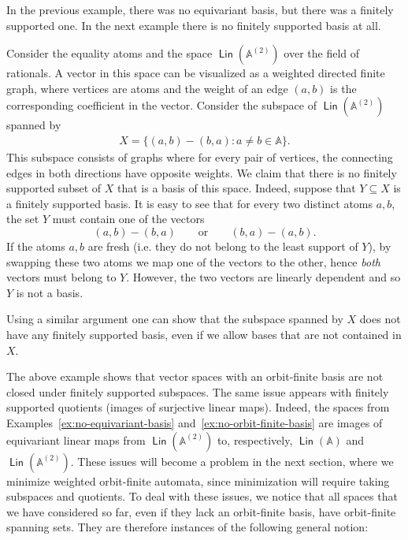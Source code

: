 \documentclass{theoretics}
\newcommand{\set}[1]{\{#1\}}
\newcommand{\atoms}{\mathbb A}
\DeclareMathOperator{\lin}{\mathsf{Lin}}
\begin{document}
In the previous example, there was no equivariant basis, but there was a finitely supported one. In the next example there is no finitely supported basis at all.
\begin{example}
    \label{ex:no-orbit-finite-basis}
    Consider the equality atoms and the space  $\lin(\atoms^{(2)})$ over the field of rationals. A vector  in this space can be visualized as a weighted directed finite graph, where 
vertices are atoms and the weight of an edge $(a,b)$ is the corresponding coefficient in the vector. 
Consider the subspace of $\lin(\atoms^{(2)})$  spanned by 
    \begin{align*}
    X = \set{(a,b) - (b,a) : a \neq b \in \atoms}.
    \end{align*}
This subspace consists of graphs where for every pair of vertices, the connecting edges in both directions have opposite weights. We claim that there is no finitely supported subset of $X$ that is a basis of this space. Indeed, suppose that $Y \subseteq X$ is a finitely supported basis. It is easy to see that for every two distinct atoms $a, b$, the set $Y$ must contain one of the  vectors
\[
	(a,b)-(b,a) \qquad \text{or} \qquad (b,a)-(a,b).
\]
If the atoms $a,b$ are fresh (i.e. they do not belong to the least support of $Y$), by swapping these two atoms we map one of the vectors to the other, hence {\em both} vectors must belong to $Y$. However, the two vectors are linearly dependent and so $Y$ is not a basis. 

Using a similar argument one can show that the subspace spanned by $X$ does not have any finitely supported basis, even if we allow bases that are not contained in $X$.
\end{example}

The above example shows that vector spaces with an orbit-finite basis are not closed under finitely supported subspaces.  The same issue appears with finitely supported quotients (images of surjective  linear maps). Indeed, the spaces from Examples~\ref{ex:no-equivariant-basis} and~\ref{ex:no-orbit-finite-basis} are images of equivariant linear maps from $\lin(\atoms^{(2)})$ to, respectively, $\lin(\atoms)$ and $\lin(\atoms^{(2)})$. These issues will become a problem in the next section, where we minimize weighted orbit-finite automata, since minimization will require taking subspaces and quotients.   
To deal with these issues, we notice that all spaces that we have considered so far, even if they lack an orbit-finite basis, have orbit-finite spanning sets. They are therefore instances of the following general notion: 
\end{document}

